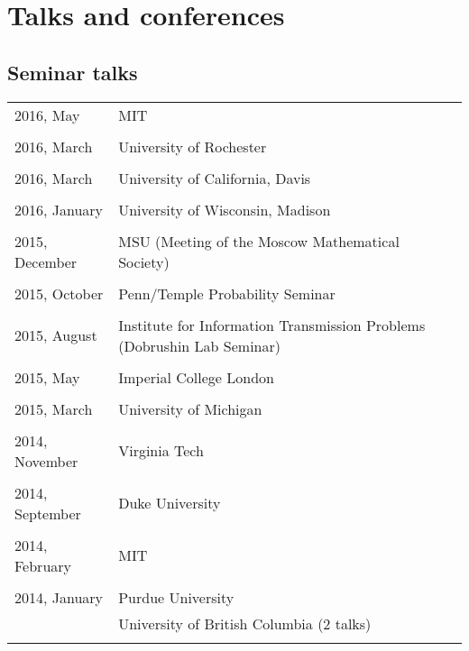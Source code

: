 \documentclass[letterpaper,11pt]{article}
\begin{document}
\section*{Talks and conferences}

\subsection*{Seminar talks}

\begin{longtable}{llc}
  2016, May
  & MIT
  \\\\
  2016, March
  & University of Rochester
  \\\\
  2016, March
  & University of California, Davis
  \\\\
  2016, January
  & University of Wisconsin, Madison
  \\\\   
  2015, December
  & MSU (Meeting of the Moscow Mathematical Society)
  \\\\   
  2015, October
  & Penn/Temple Probability Seminar
  \\\\   

  2015, August
  & Institute for Information Transmission Problems
  (Dobrushin Lab Seminar)
  \\\\ 

  2015, May
  & Imperial College London
  \\\\

  2015, March
  & University of Michigan
  \\\\

  2014, November
  & Virginia Tech\\\\

  2014, September
  & Duke University\\\\

  2014, February
  & MIT\\\\

  2014, January 
  & Purdue University &\hspace{110pt}
  \\& University of British Columbia (2 talks)\\\\
  

\end{longtable}
\end{document}
